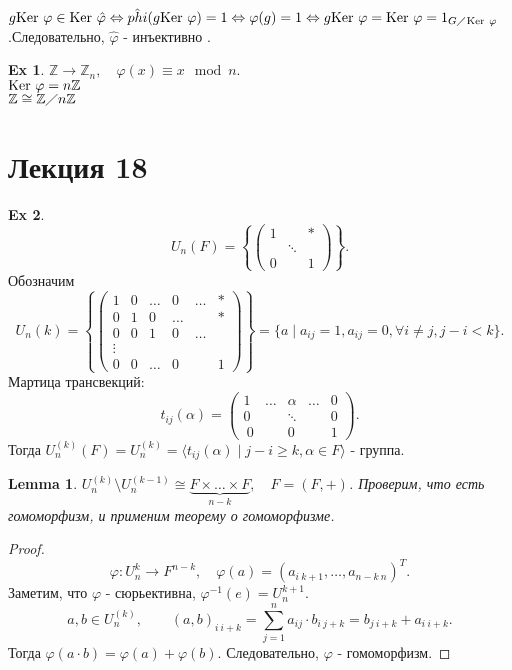 \documentclass[11pt]{book}
\newcommand{\Z}{\mathbb{Z}}
\newcommand{\slim}{\sum\limits}
\newcommand{\ke}{{\mathop{\text{\rm Ker}}}~}
\theoremstyle{definition}
\theoremstyle{plain}
\theoremstyle{plain}
\newtheorem*{lm}{Lemma}
\theoremstyle{definition}
\newtheorem*{ex}{Ex}
\theoremstyle{remark}
\begin{document}
$g \ke \varphi  \in  \ke \hat{\varphi } \Leftrightarrow \hat{phi}(g \ke \varphi ) = 1 \Leftrightarrow \varphi (g) = 1 \Leftrightarrow g \ke \varphi  = \ke \varphi  = 1_{G \diagup \ke \varphi }$.Следовательно, $\hat{\varphi }$ - инъективно .
\begin{ex}
    $\Z \to \Z_n, \quad \varphi (x) \equiv x \mod n$.\\
    $\ke \varphi  = n \Z$\\
    $\Z \cong \Z \diagup n\Z$
\end{ex}
\section{Лекция 18}
\begin{ex}
\[
    U_n(F)  = \left \{ 
	\left ( 
	\begin{array}{ccc}
	    1 &  & * \\
	      & \ddots & \\
	    0 & & 1
	\end{array}
	\right )
    \right \}
.\] 
Обозначим  \[
    U_n {(k)} = 
    \left \{
	\left ( 
	\begin{array}{cccccc}
	    1 & 0 & \ldots & 0 & \ldots & * \\
	    0 & 1 & 0 & \ldots & & * \\
	    0 & 0 & 1 & 0 &\ldots& \\
	    \vdots &&&&\\
	    0 & 0 & \ldots & 0 && 1
	\end{array}
	\right )
    \right \}
	=
	\{a \mid a_{ij} = 1, a_{ij} = 0, \forall i \ne j, j - i < k\}
.\] 
Мартица трансвекций:
\[
    t_{ij}(\alpha ) = 
    \left ( 
    \begin{array}{ccccc}
	1 & \ldots & \alpha & \ldots  & 0 \\
	0 && \ddots && 0\\\
	0 &&0&& 1
    \end{array}
    \right )
.\] 
Тогда $U^{(k)} _ n(F) = U _n^{(k)} = \langle t_{ij} (\alpha ) \mid j -i \ge  k, \alpha  \in  F \rangle$ - группа.
\begin{lm}
    $U_n^{(k)} \setminus U_n ^{(k-1)} \cong \underbrace {F \times \ldots \times F}_{n-k}, \quad F= (F, +)$. Проверим, что есть гомоморфизм, и применим теорему о гомоморфизме.
\end{lm}
\begin{proof}
\[
    \varphi : U_n ^k \to F^{n-k}, \quad \varphi (a) = (a_{i~ k+1}, \ldots , a_{n-k~ n})^T
.\] 
Заметим, что $\varphi$ - сюрьективна, $\varphi ^{-1} (e) = U^{k+1} _n$. 
\[
    a, b \in  U_n^{(k)} , \qquad (a, b) _{i~ i+k} = \slim _{j=1} ^n a_{ij} \cdot b_{i~ j+k} = b_{j~ i+k} + a_{i~ i+k}
.\] 
Тогда $\varphi (a \cdot b) = \varphi(a) + \varphi(b) $. Следовательно, $\varphi $ - гомоморфизм.
\end{proof}
\end{ex}
\end{document}
